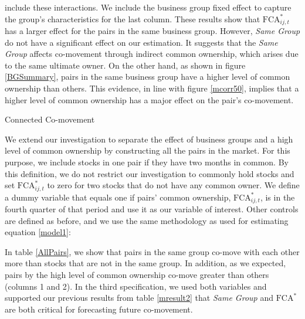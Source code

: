 \documentclass[12pt, a4paper]{article}
\begin{document}
 
  include these interactions. We include the business group fixed effect to capture the group's characteristics for the last column. These results show that $\text{FCA}^*_{ij,t}$ has a larger effect for the pairs in the same business group. However, \textit{Same Group}  do not have a significant effect on our estimation. It suggests that the \textit{Same Group}  affects co-movement through indirect common ownership, which arises due to the same ultimate owner. On the other hand, as shown in figure \ref{BGSummary}, pairs in the same business group have a higher level of common ownership than others. This evidence, in line with figure \ref{mcorr50}, implies that a higher level of common ownership has a major effect on the pair's co-movement.

\begin{table}[htbp]
\centering
\caption{Connected Co-movement}
\label{mresult2}
    \resizebox{1\textwidth}{!}{

}
\end{table}


We extend our investigation to separate the effect of business groups and a high level of common ownership by constructing all the pairs in the market. For this purpose, we include stocks in one pair if they have two months in common. By this definition, we do not restrict our investigation to commonly hold stocks and set $\text{FCA}^*_{ij,t}$ to zero for two stocks that do not have any common owner. We define a dummy variable that equals one if pairs' common ownership, $\text{FCA}^*_{ij,t}$, is in the fourth quarter of that period and use it as our variable of interest. Other controls are defined as before, and we use the same methodology as used for estimating equation \ref{model1}:


In table \ref{AllPairs}, we show that pairs in the same group co-move with each other more than stocks that are not in the same group. In addition, as we expected, pairs by the high level of common ownership co-move greater than others (columns 1 and 2). In the third specification, we used both variables and supported our previous results from table \ref{mresult2} that \textit{Same Group} and $\text{FCA}^*$ are both critical for forecasting future co-movement. 
\end{document}
